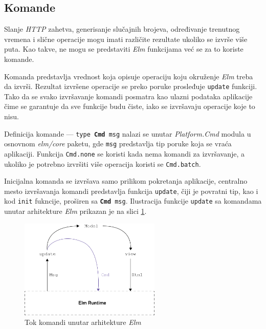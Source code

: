 \documentclass[12pt,oneside]{memoir}
\begin{document}
\subsection{Komande}
Slanje \emph{HTTP} zahetva, generisanje slučajnih brojeva, određivanje trenutnog vremena i slične operacije
mogu imati različite rezultate ukoliko se izvrše više puta. Kao takve, ne mogu se predstaviti \emph{Elm}
funkcijama već se za to koriste komande.

Komanda predstavlja vrednost koja opisuje operaciju koju okruženje \emph{Elm} treba da izvrši.
Rezultat izvršene operacije se preko poruke prosleđuje \texttt{update} funkciji. Tako da se svako
izvršavanje komandi posmatra kao ulazni podataka aplikacije čime se garantuje da sve funkcije budu
čiste, iako se izvršavaju operacije koje to nisu.

Definicija komande --- \texttt{type \textbf{Cmd} msg} nalazi se unutar \emph{Platform.Cmd} modula
u osnovnom \emph{elm/core} paketu, gde \texttt{msg} predstavlja tip poruke koja se vraća aplikaciji.
Funkcija \texttt{Cmd.none} se koristi kada nema komandi za izvršavanje, a ukoliko je potrebno izvršiti
više operacija koristi se \texttt{Cmd.batch}.

Inicijalna komanda se izvršava samo prilikom pokretanja aplikacije, centralno mesto izvršavanja komandi
predstavlja funkcija \texttt{update}, čiji je povratni tip, kao i kod \texttt{init} fukncije, proširen sa \texttt{\textbf{Cmd} msg}.
Ilustracija funkcije \texttt{update} sa komandama unutar arhitekture \emph{Elm} prikazan je na slici \ref{fig:elm-command}.
\begin{figure}[!h]
  \centering
  \includegraphics[width=0.6\textwidth]{elm-command.png}
  \caption{Tok komandi unutar arhitekture \emph{Elm}}
  \label{fig:elm-command}
\end{figure}
\end{document}
